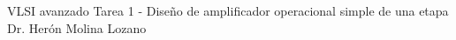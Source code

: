 




	\pnormal
	{VLSI avanzado}
	{Tarea 1 - Diseño de amplificador operacional simple de una etapa}
	{Dr. Herón Molina Lozano}
	\tableofcontents
	
	\newpage 
	\newpage 
	\clearpage 
	\clearpage 
	
	\newpage 



